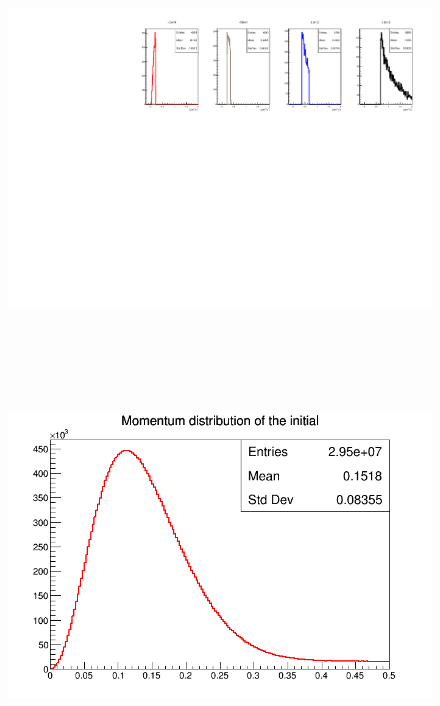 \documentclass[a4paper,11pt,twoside]{article}
\date{\today}
\begin{document}
\title{}
\maketitle


\begin{figure}[h!]
\includegraphics[height=10.0cm]{figs/t_n_Incoh.pdf}
\caption{}
\label{fig:exp}
\end{figure}

\begin{figure}[h!]
\includegraphics[height=10.0cm]{figs/sim_Fermi_mom.png}
\caption{}
\label{fig:fermi}
\end{figure}
\end{document}
